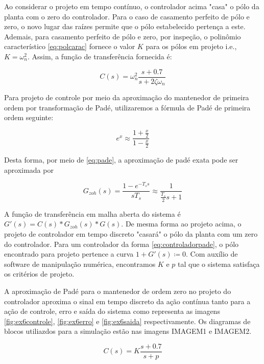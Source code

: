     Ao considerar o projeto em tempo contínuo, o controlador acima "casa" o pólo da planta com o zero do controlador. Para o caso de casamento perfeito de pólo e zero, o novo lugar das raízes permite que o pólo estabelecido pertença a este. Ademais, para casamento perfeito de pólo e zero, por inspeção, o polinômio característico \eqref{eq:polcarac} fornece o valor $K$ para os pólos em projeto i.e., $K = \omega_n^2$. Assim, a função de transferência fornecida é:
    
        \begin{equation}
            C(s) = \omega_n^2 \frac{s + 0.7}{s + 2 \zeta \omega_n}
        \end{equation}
        
    Para projeto de controle por meio da aproximação do mantenedor de primeira ordem por transformação de Padé, utilizaremos a fórmula de Padé de primeira ordem seguinte:
    
    \begin{equation}
    e^{x} \approx \frac{1 + \frac{x}{2}}{1 - \frac{x}{2}}
    \label{eq:pade}
    \end{equation}
    
    Desta forma, por meio de \eqref{eq:pade}, a aproximação de padé exata pode ser aproximada por
    
    \begin{equation}
    G_{zoh}(s) = \frac{1 - e^{-T_s s}}{s T_s} \approx \frac{1}{\frac{T_s}{2} s + 1}
    \end{equation}
    
    A função de transferência em malha aberta do sistema é $G'(s) = C(s)*G_{zoh}(s)*G(s)$. De mesma forma ao projeto acima, o projeto de controlador em tempo discreto "casará" o pólo da planta com um zero do controlador. Para um controlador da forma \eqref{eq:controladorpade}, o pólo encontrado para projeto pertence a curva $1 + G'(s) \coloneqq 0$.   Com auxílio de software de manipulação numérica, encontramos $K$ e $p$ tal que o sistema satisfaça os critérios de  projeto. 
    
    A aproximação de Padé para o mantenedor de ordem zero no projeto do controlador aproxima o sinal em tempo discreto da ação contínua tanto para a ação de controle, erro e saída do sistema como representa as imagens \ref{fig:ex6controle}, \ref{fig:ex6erro} e \ref{fig:ex6saida} respectivamente. Os diagramas de blocos utiliazdos para a simulação estão nas imagens IMAGEM1 e IMAGEM2.
    
    \begin{equation}
    \label{eq:controladorpade}
        C(s) = K \frac{s + 0.7}{s + p}
    \end{equation}
    

